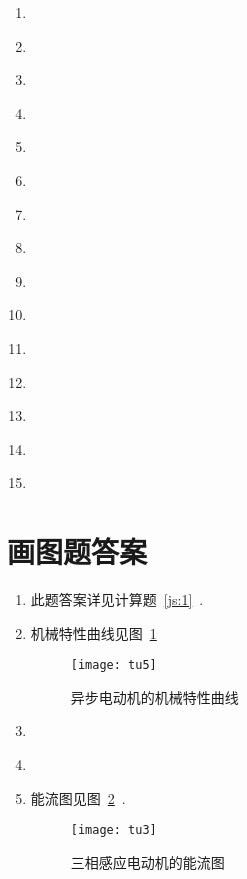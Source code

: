 \documentclass[lang=cn,11pt,marginpar=margintrue]{elegantbook}%
\begin{document}
\begin{enumerate}
	\item \label{tk:56}
	\item \label{tk:57}
	\item \label{tk:58}
	\item \label{tk:59}
	\item \label{tk:60}
	\item \label{tk:61}
	\item \label{tk:62}
	\item \label{tk:63}
	\item \label{tk:64}
	\item \label{tk:65}
	\item \label{tk:66}
	\item \label{tk:67}
	\item \label{tk:68}
	\item \label{tk:69}
	\item \label{tk:70}
	
\end{enumerate}
\section{画图题答案}
\begin{enumerate}
	\item \label{ht:1}此题答案详见计算题~\ref{js:1}~.
	\item \label{ht:2}机械特性曲线见图~\ref{tu:5}~
		\begin{figure}[htbp]
			\centering
			\texttt{[image: tu5]}
			\caption{异步电动机的机械特性曲线}\label{tu:5}
		\end{figure}
	\item \label{ht:3}
	\item \label{ht:4}
	\item \label{ht:5}能流图见图~\ref{tu:3}~.
		\begin{figure}[htbp]
			\centering
			\texttt{[image: tu3]}
			\caption{三相感应电动机的能流图}\label{tu:3}
		\end{figure}
\end{enumerate}
\end{document}
